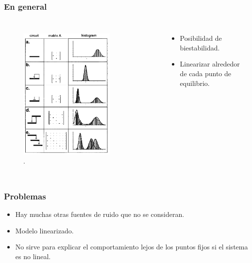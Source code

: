 \documentclass{beamer}
\begin{document}
\begin{frame}
\frametitle{En general}
\begin{columns}[c]
\begin{figure}[p]
    \centering
    \includegraphics[width=0.75\textwidth]{graph4.png}\\
    \tiny \cite{p1}.
\end{figure}
\begin{itemize}
\item Posibilidad de biestabilidad.
\item Linearizar alrededor de cada punto de equilibrio.
\end{itemize}
\end{columns}
\end{frame}

\begin{frame}
\frametitle{Problemas}
\begin{itemize}
\item Hay muchas otras fuentes de ruido que no se consideran.
\item Modelo linearizado.
\item No sirve para explicar el comportamiento lejos de los puntos fijos si el sistema es no lineal.
\end{itemize}
\end{frame}
\end{document}
